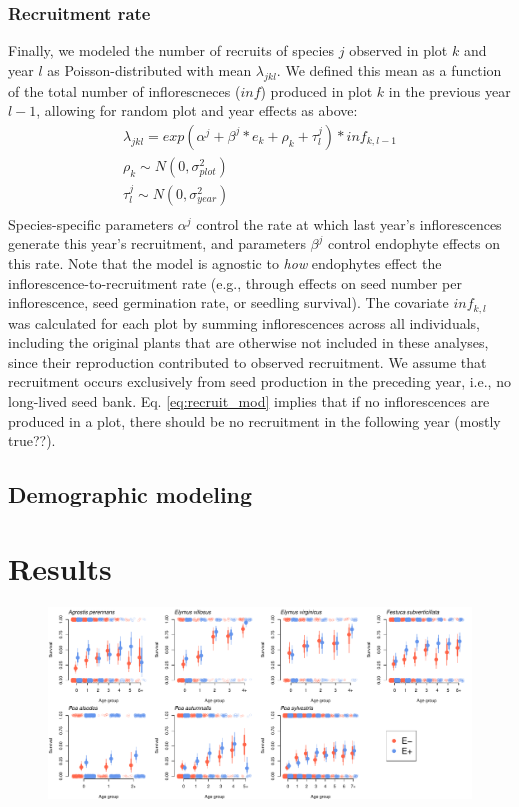 \documentclass[11pt]{article}
\begin{document}
\subsubsection*{Recruitment rate}
Finally, we modeled the number of recruits of species $j$ observed in plot $k$ and year $l$ as Poisson-distributed with mean $\lambda_{jkl}$. 
We defined this mean as a function of the total number of inflorescneces ($inf$) produced in plot $k$ in the previous year $l-1$, allowing for random plot and year effects as above:
\begin{align*}
	\lambda_{jkl} = exp(\alpha^{j} + \beta^{j}*e_k + \rho_k + \tau^{j}_{l}) * inf_{k,l-1}\\
	\rho_k \sim N(0,\sigma^2_{plot})\\
	\tau^{j}_{l} \sim N(0,\sigma^2_{year})\\
\end{align*}
Species-specific parameters $\alpha^{j}$ control the rate at which last year's inflorescences generate this year's recruitment, and parameters $\beta^{j}$ control endophyte effects on this rate. 
Note that the model is agnostic to \emph{how} endophytes effect the inflorescence-to-recruitment rate (e.g., through effects on seed number per inflorescence, seed germination rate, or seedling survival). 
The covariate $inf_{k,l}$ was calculated for each plot by summing inflorescences across all individuals, including the original plants that are otherwise not included in these analyses, since their reproduction contributed to observed recruitment. 
We assume that recruitment occurs exclusively from seed production in the preceding year, i.e., no long-lived seed bank. 
Eq. \ref{eq:recruit_mod} implies that if no inflorescences are produced in a plot, there should be no recruitment in the following year (mostly true??). 

\subsection*{Demographic modeling}

\section*{Results}

\begin{figure}
	\begin{center}
		\includegraphics[width=1\linewidth]{figures/age_specific_survival}
		\caption{}
		\label{fig:age_surv}
	\end{center}
\end{figure}
\end{document}
